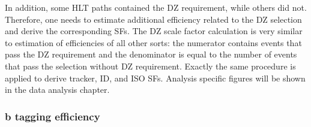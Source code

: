 

%
%

In addition, some HLT paths contained the DZ requirement, while others did not. Therefore, one needs to estimate additional efficiency related to the DZ selection and derive the corresponding SFs. The DZ scale factor calculation is very similar to estimation of efficiencies of all other sorts: the numerator contains events that pass the DZ requirement and the denominator is equal to the number of events that pass the selection without DZ requirement. Exactly the same procedure is applied to derive tracker, ID, and ISO SFs. Analysis specific figures will be shown in the data analysis chapter. 

\subsubsection{b tagging efficiency}\label{sec:b_tagging}

